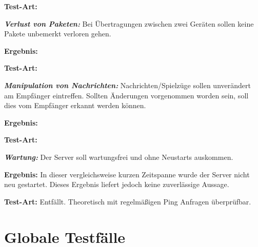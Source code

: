 \documentclass[parskip=full]{scrartcl}
\begin{document}
\begin{description}
	\item \textbf{Test-Art: }
	\item[NF1060] \textbf{\textit{Verlust von Paketen: }} Bei Übertragungen zwischen zwei Geräten sollen keine Pakete unbemerkt verloren gehen.
	\item \textbf{Ergebnis: }
	\item \textbf{Test-Art: }
	\item[NF1070] \textbf{\textit{Manipulation von Nachrichten: }} Nachrichten/Spielzüge sollen unverändert am Empfänger eintreffen. Sollten Änderungen vorgenommen worden sein, soll dies vom Empfänger erkannt werden können.
	\item \textbf{Ergebnis: }
	\item \textbf{Test-Art: }
	\item[NF1080] \textbf{\textit{Wartung: }} Der Server soll wartungsfrei und ohne Neustarts auskommen.
	\item \textbf{Ergebnis: } In dieser vergleichsweise kurzen Zeitspanne wurde der Server nicht neu gestartet. Dieses Ergebnis liefert jedoch keine zuverlässige Aussage.
	\item \textbf{Test-Art: } Entfällt. Theoretisch mit regelmäßigen Ping Anfragen überprüfbar.
	
	
\end{description}

\section{Globale Testfälle}
\end{document}
